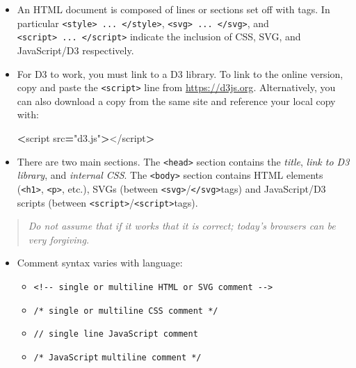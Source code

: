 \documentclass[openany]{book}
\newenvironment{Shaded}{\begin{snugshade}}{\end{snugshade}}
\newcommand{\NormalTok}[1]{#1}
\newcommand{\OperatorTok}[1]{\textcolor[rgb]{0.81,0.36,0.00}{\textbf{#1}}}
\newcommand{\StringTok}[1]{\textcolor[rgb]{0.31,0.60,0.02}{#1}}
\begin{document}
\begin{itemize}
\item
  An HTML document is composed of lines or sections set off with tags. In particular \texttt{\textless{}style\textgreater{}\ ...\ \textless{}/style\textgreater{}}, \texttt{\textless{}svg\textgreater{}\ ...\ \textless{}/svg\textgreater{}}, and \texttt{\textless{}script\textgreater{}\ ...\ \textless{}/script\textgreater{}} indicate the inclusion of CSS, SVG, and JavaScript/D3 respectively.
\item
  For D3 to work, you must link to a D3 library. To link to the online version, copy and paste the \texttt{\textless{}script\textgreater{}} line from \url{https://d3js.org}. Alternatively, you can also download a copy from the same site and reference your local copy with:

\begin{Shaded}
\begin{Highlighting}[]
\OperatorTok{<}\NormalTok{script src}\OperatorTok{=}\StringTok{"d3.js"}\OperatorTok{>}\NormalTok{</script}\OperatorTok{>}
\end{Highlighting}
\end{Shaded}
\item
  There are two main sections. The \texttt{\textless{}head\textgreater{}} section contains the \emph{title}, \emph{link to D3 library}, and \emph{internal CSS}. The \texttt{\textless{}body\textgreater{}} section contains HTML elements (\texttt{\textless{}h1\textgreater{}}, \texttt{\textless{}p\textgreater{}}, etc.), SVGs (between \texttt{\textless{}svg\textgreater{}}/\texttt{\textless{}/svg\textgreater{}}tags) and JavaScript/D3 scripts (between \texttt{\textless{}script\textgreater{}}/\texttt{\textless{}script\textgreater{}}tags).
\end{itemize}

\begin{quote}
 \emph{Do not assume that if it works that it is correct; today's browsers can be very forgiving.}
\end{quote}

\begin{itemize}
\item
  Comment syntax varies with language:

  \begin{itemize}
  \item
    \texttt{\textless{}!-\/-\ single\ or\ multiline\ HTML\ or\ SVG\ comment\ -\/-\textgreater{}}
  \item
    \texttt{/*\ single\ or\ multiline\ CSS\ comment\ */}
  \item
    \texttt{//\ single\ line\ JavaScript\ comment}
  \item
    \texttt{/*\ JavaScript} \texttt{multiline\ comment\ */}
  \end{itemize}
\end{itemize}
\end{document}
